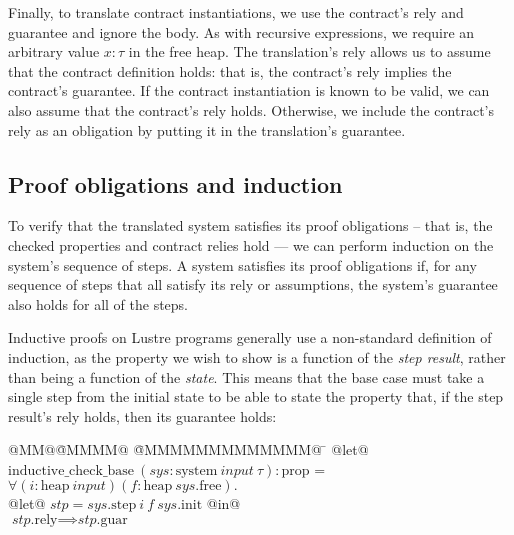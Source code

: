 Finally, to translate contract instantiations, we use the contract's rely and guarantee and ignore the body.
As with recursive expressions, we require an arbitrary value $x: \tau$ in the free heap.
The translation's rely allows us to assume that the contract definition holds: that is, the contract's rely implies the contract's guarantee.
If the contract instantiation is known to be valid, we can also assume that the contract's rely holds.
Otherwise, we include the contract's rely as an obligation by putting it in the translation's guarantee.

\subsection{Proof obligations and induction}
\label{s:transition:ind}

To verify that the translated system satisfies its proof obligations -- that is, the checked properties and contract relies hold --- we can perform induction on the system's sequence of steps.
A system satisfies its proof obligations if, for any sequence of steps that all satisfy its rely or assumptions, the system's guarantee also holds for all of the steps.

Inductive proofs on Lustre programs generally use a non-standard definition of induction, as the property we wish to show is a function of the \emph{step result}, rather than being a function of the \emph{state}.
This means that the base case must take a single step from the initial state to be able to state the property that, if the step result's rely holds, then its guarantee holds:
\begin{tabbing}
  @MM@\= @MMMM@ \= @MMMMMMMMMMMMM@ \= \kill
  @let@ $\text{inductive_check_base}~(\textit{sys}: \text{system}~\textit{input}~\tau): \text{prop}$ = \\
  \> $\forall (i: \text{heap}~\textit{input}) (f: \text{heap}~\textit{sys}\text{.free}).$ \\
  \> @let@ $\textit{stp} = \textit{sys}\text{.step}~ i~ f~ \textit{sys}\text{.init}$ @in@ \\
  \> $\textit{stp}\text{.rely} \implies \textit{stp}\text{.guar}$
\end{tabbing}

